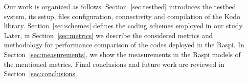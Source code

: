Our work is organized as follows. Section~\ref{sec:testbed} introduces the
testbed system, its setup, files configuration, connectivity and compilation of
the Kodo library. Section~\ref{sec:schemes} defines the coding schemes employed
in our study. Later, in Section~\ref{sec:metrics} we describe the considered
metrics and methodology for performance comparison of the codes deployed in
the \ac{Raspi}. In Section~\ref{sec:measurements}, we show the measurements in
the \ac{Raspi} models of the mentioned metrics. Final conclusions and future work
are reviewed in Section~\ref{sec:conclusions}.


